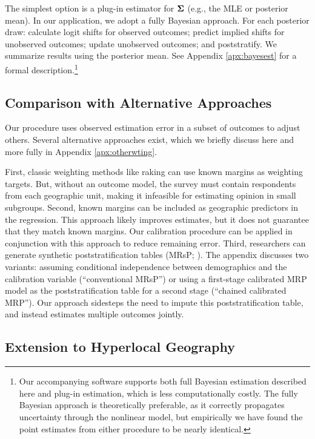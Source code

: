 The simplest option is a plug-in estimator for $\mathbf{\Sigma}$ (e.g., the MLE or posterior mean). In our application, we adopt a fully Bayesian approach.
For each posterior draw: calculate logit shifts for observed outcomes; predict implied shifts for unobserved outcomes; update unobserved outcomes; and poststratify. We summarize results using the posterior mean.
See Appendix \ref{apx:bayesest} for a formal description.\footnote{Our accompanying software supports both full Bayesian estimation described here and plug-in estimation, which is less computationally costly. The fully Bayesian approach is theoretically preferable, as it correctly propagates uncertainty through the nonlinear model, but empirically we have found the point estimates from either procedure to be nearly identical.}

\subsection{Comparison with Alternative Approaches}
\label{sec:comparison}

Our procedure uses observed estimation error in a subset of outcomes to adjust others. Several alternative approaches exist, which we briefly discuss here and more fully in Appendix \ref{apx:otherwting}.

First, classic weighting methods like raking can use known margins as weighting targets. But, without an outcome model, the survey must contain respondents from each geographic unit, making it infeasible for estimating opinion in small subgroups. 
Second, known margins can be included as geographic predictors in the regression. 
This approach likely improves estimates, but it does not guarantee that they match known margins.
Our calibration procedure can be applied in conjunction with this approach to reduce remaining error.
Third, researchers can generate synthetic poststratification tables (MRsP; \citealt{LW:2017}). The appendix discusses two variants: assuming conditional independence between demographics and the calibration variable (``conventional MRsP'') or using a first-stage calibrated MRP model as the poststratification table for a second stage (``chained calibrated MRP'').
Our approach sidesteps the need to impute this poststratification table, and instead estimates multiple outcomes jointly. 



\subsection{Extension to Hyperlocal Geography}


